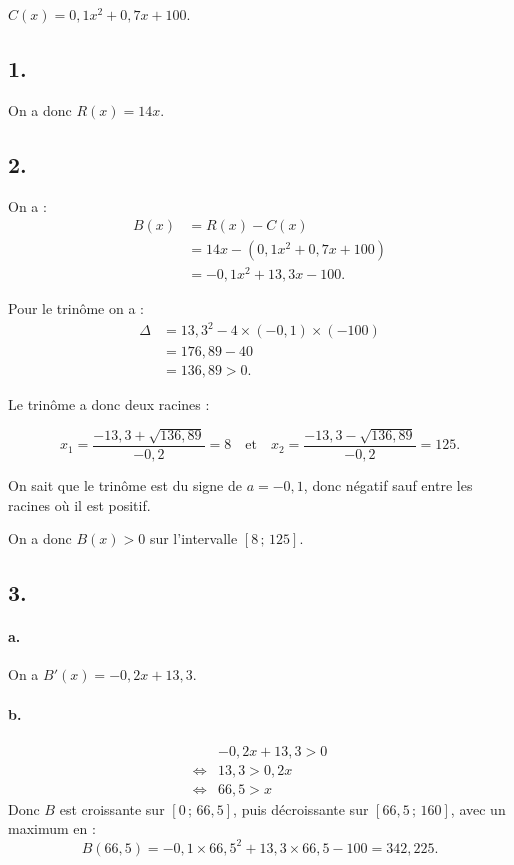 \(C(x) = 0{,}1x^2 + 0{,}7x + 100\).

\subsection*{1.}

On a donc \( R(x) = 14x \).

\subsection*{2.}

On a :
\begin{align*}
B(x) &= R(x) - C(x) \\
&= 14x - (0{,}1x^2 + 0{,}7x + 100) \\
&= -0{,}1x^2 + 13{,}3x - 100.
\end{align*}

Pour le trinôme on a :
\begin{align*}
\Delta &= 13{,}3^2 - 4 \times (-0{,}1) \times (-100) \\
&= 176{,}89 - 40 \\
&= 136{,}89 > 0.
\end{align*}

Le trinôme a donc deux racines :

\[
x_1 = \dfrac{-13{,}3 + \sqrt{136{,}89}}{-0{,}2} = 8 \quad \text{et} \quad x_2 = \dfrac{-13{,}3 - \sqrt{136{,}89}}{-0{,}2} = 125.
\]

On sait que le trinôme est du signe de \( a = -0{,}1 \), donc négatif sauf entre les racines où il est positif. 

On a donc \( B(x) > 0 \) sur l'intervalle \( [8 \,;\, 125] \).

\subsection*{3.}

\paragraph{a.} On a \( B'(x) = -0{,}2x + 13{,}3 \).

\paragraph{b.}
\begin{align*}
&-0{,}2x + 13{,}3 > 0 \\
\iff &13{,}3 > 0{,}2x \\
\iff &66{,}5 > x
\end{align*}
Donc \(B\) est croissante sur \([0 \,;\, 66{,}5]\), puis décroissante sur \([66{,}5 \,;\, 160]\), avec un maximum en :
\[
B(66{,}5) = -0{,}1 \times 66{,}5^2 + 13{,}3 \times 66{,}5 - 100 = 342{,}225.
\]

